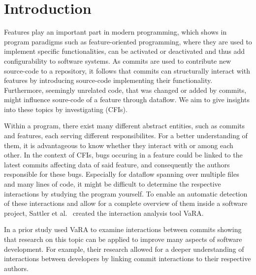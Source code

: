 \section{Introduction}\label{ch:introduction}

Features play an important part in modern programming, which shows in program paradigms such as feature-oriented programming,
where they are used to implement specific functionalities, can be activated or deactivated and thus add configurability to software systems.
As commits are used to contribute new source-code to a repository,
it follows that commits can structurally interact with features by introducing source-code implementing their functionality. 
Furthermore, seemingly unrelated code, that was changed or added by commits, might influence soure-code of a feature through dataflow.
We aim to give insights into these topics by investigating  (CFIs).

Within a program, there exist many different abstract entities, such as commits and features, each serving different responsibilites.
For a better understanding of them, it is advantageous to know whether they interact with or among each other.
In the context of CFIs, bugs occuring in a feature could be linked to the latest commits affecting data of said feature, and consequently the authors responsible for these bugs.
Especially for dataflow spanning over multiple files and many lines of code, it might be difficult to determine the respective interactions by studying the program yourself.
To enable an automatic detection of these interactions and allow for a complete overview of them inside a software project, Sattler et al.~\cite{sattler2023thesis} created the interaction analysis tool VaRA.

In a prior study \citet{sattler2023seal} used VaRA to examine interactions between commits showing that research on this topic can be applied to improve many aspects of software development.
For example, their research allowed for a deeper understanding of interactions between developers by linking commit interactions to their respective authors.


